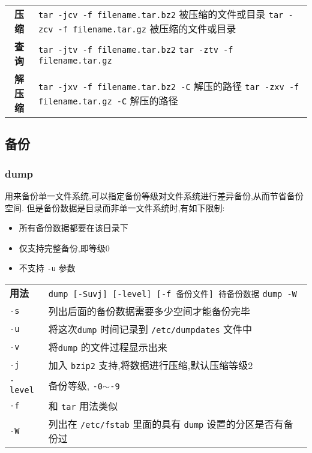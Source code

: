 \begin{longtable}{c@{: }p{}}\hline\hline
    \textbf{压缩} & \texttt{tar -jcv -f filename.tar.bz2} 被压缩的文件或目录 \newline
    \texttt{tar -zcv -f filename.tar.gz} 被压缩的文件或目录
     \\

    \textbf{查询} & \texttt{tar -jtv -f filename.tar.bz2} \newline
    \texttt{tar -ztv -f filename.tar.gz}
     \\

    \textbf{解压缩} & \texttt{tar -jxv -f filename.tar.bz2 -C} 解压的路径 \newline
    \texttt{tar -zxv -f filename.tar.gz -C} 解压的路径
     \\\hline
\end{longtable}


\subsection{备份}
\subsubsection{dump}
用来备份单一文件系统,可以指定备份等级对文件系统进行差异备份,从而节省备份空间. 但是备份数据是目录而非单一文件系统时,有如下限制:
\begin{itemize}
    \item 所有备份数据都要在该目录下
    \item 仅支持完整备份,即等级0
    \item 不支持 \texttt{-u} 参数
\end{itemize}
\begin{longtable}{l@{ : }p{}}\hline\hline

    \textbf{用法} & \verb"dump [-Suvj] [-level] [-f 备份文件] 待备份数据" \newline
                    \verb"dump -W"
    \\

    \texttt{-s} & 列出后面的备份数据需要多少空间才能备份完毕 \\

    \texttt{-u} & 将这次\texttt{dump} 时间记录到 \texttt{/etc/dumpdates} 文件中 \\

    \texttt{-v} & 将\texttt{dump}  的文件过程显示出来\\

    \texttt{-j} & 加入 \texttt{bzip2} 支持,将数据进行压缩,默认压缩等级2\\

    \texttt{-level} & 备份等级, \texttt{-0$\sim$-9}\\

    \texttt{-f} & 和 \texttt{tar} 用法类似\\

    \texttt{-W} & 列出在 \texttt{/etc/fstab} 里面的具有 \texttt{dump} 设置的分区是否有备份过\\

    \hline
\end{longtable}


